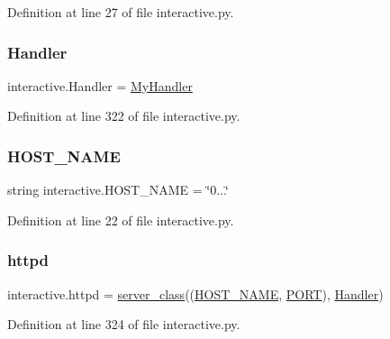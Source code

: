Definition at line 27 of file interactive.\+py.

\mbox{\label{namespaceinteractive_a28aaaccae824c1a30a74f3c7866cded6}} 
\subsubsection{\texorpdfstring{Handler}{Handler}}
{\footnotesize\ttfamily interactive.\+Handler = \hyperlink{classinteractive_1_1MyHandler}{My\+Handler}}



Definition at line 322 of file interactive.\+py.

\mbox{\label{namespaceinteractive_a38d457310aa09e965304a7a638f605ca}} 
\subsubsection{\texorpdfstring{H\+O\+S\+T\+\_\+\+N\+A\+ME}{HOST\_NAME}}
{\footnotesize\ttfamily string interactive.\+H\+O\+S\+T\+\_\+\+N\+A\+ME = \char`\"{}0...\char`\"{}}



Definition at line 22 of file interactive.\+py.

\mbox{\label{namespaceinteractive_af85f4233639655e77d23509cde2e1bcd}} 
\subsubsection{\texorpdfstring{httpd}{httpd}}
{\footnotesize\ttfamily interactive.\+httpd = \hyperlink{namespaceinteractive_a96f77c181c65bfcb2c21e3e466b89c2f}{server\+\_\+class}((\hyperlink{namespaceinteractive_a38d457310aa09e965304a7a638f605ca}{H\+O\+S\+T\+\_\+\+N\+A\+ME}, \hyperlink{namespaceinteractive_a29341b624435b00b983e5a91adfdc374}{P\+O\+RT}), \hyperlink{namespaceinteractive_a28aaaccae824c1a30a74f3c7866cded6}{Handler})}



Definition at line 324 of file interactive.\+py.

